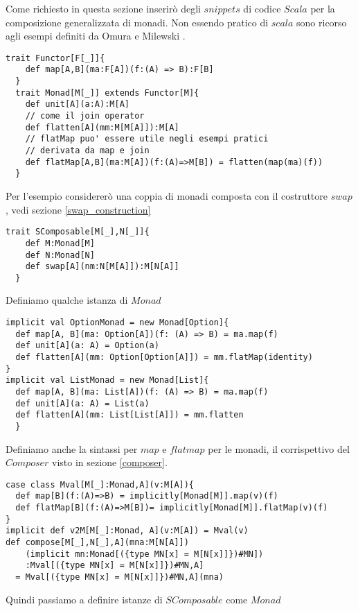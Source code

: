 Come richiesto in questa sezione inserirò degli $snippets$ di codice $Scala$
per la composizione generalizzata di monadi.
Non essendo pratico di $scala$ sono ricorso agli esempi definiti da Omura \cite{omura0}
e Milewski \cite{milewski0}.

\begin{lstlisting}[style=myScalastyle, caption=Functor and Monad Traits]
  trait Functor[F[_]]{
    def map[A,B](ma:F[A])(f:(A) => B):F[B]
  }
  trait Monad[M[_]] extends Functor[M]{
    def unit[A](a:A):M[A]
    // come il join operator
    def flatten[A](mm:M[M[A]]):M[A]
    // flatMap puo' essere utile negli esempi pratici
    // derivata da map e join
    def flatMap[A,B](ma:M[A])(f:(A)=>M[B]) = flatten(map(ma)(f))
  }
\end{lstlisting}

Per l'esempio considererò una coppia di monadi composta con il costruttore $swap$,
vedi sezione \ref{swap_construction}

\begin{lstlisting}[style=myScalastyle, caption=Swap Constructor]
  trait SComposable[M[_],N[_]]{
    def M:Monad[M]
    def N:Monad[N]
    def swap[A](nm:N[M[A]]):M[N[A]]
  }
\end{lstlisting}

Definiamo qualche istanza di $Monad$

\begin{lstlisting}[style=myScalastyle, caption=Type class instances]
implicit val OptionMonad = new Monad[Option]{
  def map[A, B](ma: Option[A])(f: (A) => B) = ma.map(f)
  def unit[A](a: A) = Option(a)
  def flatten[A](mm: Option[Option[A]]) = mm.flatMap(identity)
}
implicit val ListMonad = new Monad[List]{
  def map[A, B](ma: List[A])(f: (A) => B) = ma.map(f)
  def unit[A](a: A) = List(a)
  def flatten[A](mm: List[List[A]]) = mm.flatten
  }
\end{lstlisting}
\pagebreak
Definiamo anche la sintassi per $map$ e $flatmap$ per le monadi, il corrispettivo
del $Composer$ visto in sezione \ref{composer}.
\begin{lstlisting}[style=myScalastyle, caption=Type class instances]
case class Mval[M[_]:Monad,A](v:M[A]){
  def map[B](f:(A)=>B) = implicitly[Monad[M]].map(v)(f)
  def flatMap[B](f:(A)=>M[B])= implicitly[Monad[M]].flatMap(v)(f)
}
implicit def v2M[M[_]:Monad, A](v:M[A]) = Mval(v)
def compose[M[_],N[_],A](mna:M[N[A]])
    (implicit mn:Monad[({type MN[x] = M[N[x]]})#MN])
    :Mval[({type MN[x] = M[N[x]]})#MN,A]
  = Mval[({type MN[x] = M[N[x]]})#MN,A](mna)
\end{lstlisting}
Quindi passiamo a definire istanze di $SComposable$ come $Monad$

